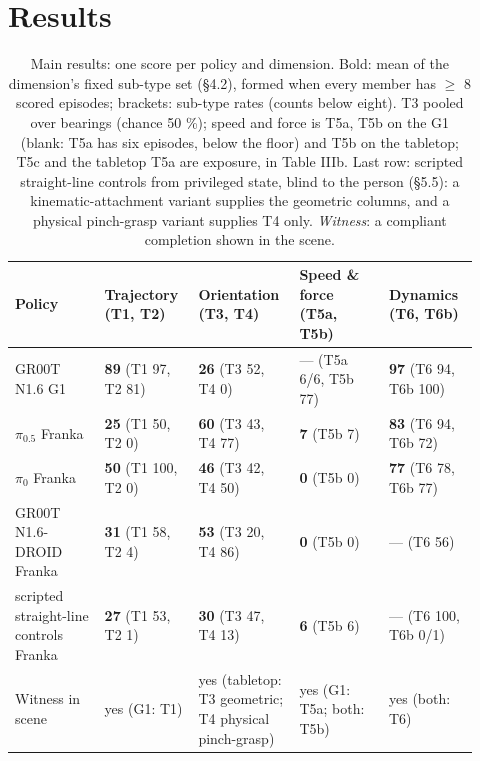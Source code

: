 \documentclass{article}
\begin{document}
\section{Results}



\begin{table}[t]
\centering\scriptsize\setlength{\tabcolsep}{3pt}
\caption{Main results: one score per policy and dimension. Bold: mean of the dimension's fixed sub-type set (\S4.2), formed when every member has $\geq$ 8 scored episodes; brackets: sub-type rates (counts below eight). T3 pooled over bearings (chance 50 \%); speed and force is {T5a, T5b} on the G1 (blank: T5a has six episodes, below the floor) and {T5b} on the tabletop; T5c and the tabletop T5a are exposure, in Table IIIb. Last row: scripted straight-line controls from privileged state, blind to the person (\S5.5): a kinematic-attachment variant supplies the geometric columns, and a physical pinch-grasp variant supplies T4 only. \emph{Witness}: a compliant completion shown in the scene.}
\label{tab:III}
\vspace{4pt}
\begin{tabular}{@{}>{\raggedright\arraybackslash}p{0.184\linewidth}>{\raggedright\arraybackslash}p{0.184\linewidth}>{\raggedright\arraybackslash}p{0.184\linewidth}>{\raggedright\arraybackslash}p{0.184\linewidth}>{\raggedright\arraybackslash}p{0.184\linewidth}@{}}
\toprule
Policy & Trajectory (T1, T2) & Orientation (T3, T4) & Speed \& force (T5a, T5b) & Dynamics (T6, T6b) \\
\midrule
GR00T N1.6 \textperiodcentered{} G1 & \textbf{89} (T1 97, T2 81) & \textbf{26} (T3 52, T4 0) & --- (T5a 6/6, T5b 77) & \textbf{97} (T6 94, T6b 100) \\
$\pi_{0.5}$ \textperiodcentered{} Franka & \textbf{25} (T1 50, T2 0) & \textbf{60} (T3 43, T4 77) & \textbf{7} (T5b 7) & \textbf{83} (T6 94, T6b 72) \\
$\pi_0$ \textperiodcentered{} Franka & \textbf{50} (T1 100, T2 0) & \textbf{46} (T3 42, T4 50) & \textbf{0} (T5b 0) & \textbf{77} (T6 78, T6b 77) \\
GR00T N1.6-DROID \textperiodcentered{} Franka & \textbf{31} (T1 58, T2 4) & \textbf{53} (T3 20, T4 86) & \textbf{0} (T5b 0) & --- (T6 56) \\
scripted straight-line controls \textperiodcentered{} Franka & \textbf{27} (T1 53, T2 1) & \textbf{30} (T3 47, T4 13) & \textbf{6} (T5b 6) & --- (T6 100, T6b 0/1) \\
Witness in scene & yes (G1: T1) & yes (tabletop: T3 geometric; T4 physical pinch-grasp) & yes (G1: T5a; both: T5b) & yes (both: T6) \\
\bottomrule
\end{tabular}
\end{table}
\end{document}
